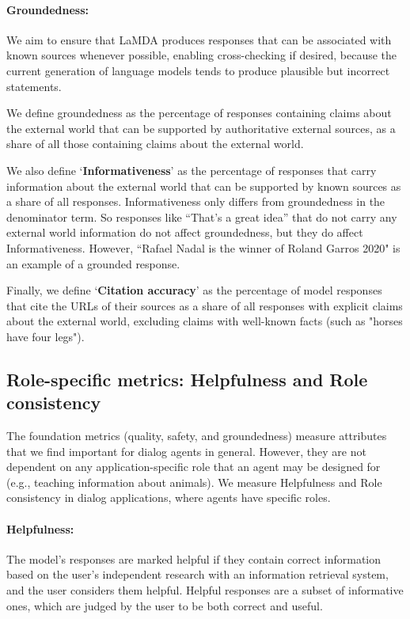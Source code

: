 \paragraph{Groundedness:} We aim to ensure that LaMDA produces responses that can be associated with known sources whenever possible, enabling cross-checking if desired, because the current generation of language models tends to produce plausible but incorrect statements.

We define groundedness as the percentage of responses containing claims about the external world that can be supported by authoritative external sources, as a share of all those containing claims about the external world.

We also define `{\bf Informativeness}' as the percentage of responses that carry information about the external world that can be supported by known sources as a share of all responses. Informativeness only differs from groundedness in the denominator term. So responses like “That’s a great idea” that do not carry any external world information do not affect groundedness, but they do affect Informativeness. However, “Rafael Nadal is the winner of Roland Garros 2020" is an example of a grounded response.

Finally, we define `{\bf Citation accuracy}' as the percentage of model responses that cite the URLs of their sources as a share of all responses with explicit claims about the external world, excluding claims with well-known facts (such as "horses have four legs").

\subsection{Role-specific metrics: Helpfulness and Role consistency}
\label{sec:metrics-role}

The foundation metrics (quality, safety, and groundedness) measure attributes that we find important for dialog agents in general. However, they are not dependent on any application-specific role that an agent may be designed for (e.g., teaching information about animals). We measure Helpfulness and Role consistency in dialog applications, where agents have specific roles.

\paragraph{Helpfulness:} The model’s responses are marked helpful if they contain correct information based on the user’s independent research with an information retrieval system, and the user considers them helpful. Helpful responses are a subset of informative ones, which are judged by the user to be both correct and useful.

